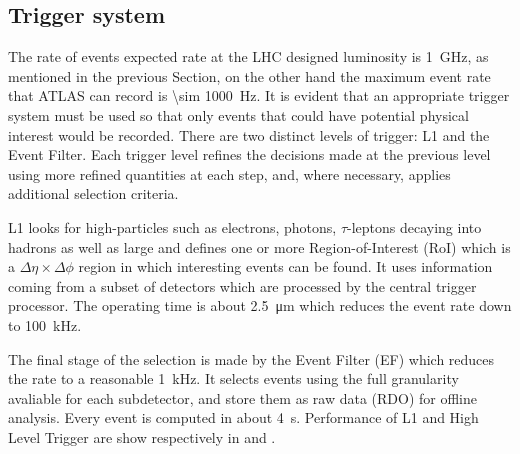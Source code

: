 \subsection{Trigger system}
The rate of events expected rate at the LHC designed luminosity is \SI{1}{\GHz}, as mentioned in the previous Section, on the other hand the maximum event rate that ATLAS can record is \SI{\sim 1000}{\Hz}. It is evident that an appropriate trigger system must be used so that only events that could have potential physical interest would be recorded. There are two distinct levels of trigger: L1 and the Event Filter. Each trigger level refines the decisions made at the previous level using more refined quantities at each step, and, where necessary, applies additional selection criteria.

L1 looks for high-\pt particles such as electrons, photons, $\tau$-leptons decaying into hadrons as well as large \met and defines one or more Region-of-Interest (RoI) which is a $\Delta \eta \times \Delta \phi$ region in which interesting events can be found. It uses information coming from a subset of detectors which are processed by the central trigger processor. The operating time is about \SI{2.5}{\um} which reduces the event rate down to \SI{100}{\kHz}.

The final stage of the selection is made by the Event Filter (EF) which reduces the rate to a reasonable \SI{1}{\kHz}. It selects events using the full granularity avaliable for each subdetector, and store them as raw data (RDO) for offline analysis. Every event is computed in about \SI{4}{\s}. Performance of L1 and High Level Trigger are show respectively in \Fig{\ref{fig:L1}} and \Fig{\ref{fig:HLT}}.


